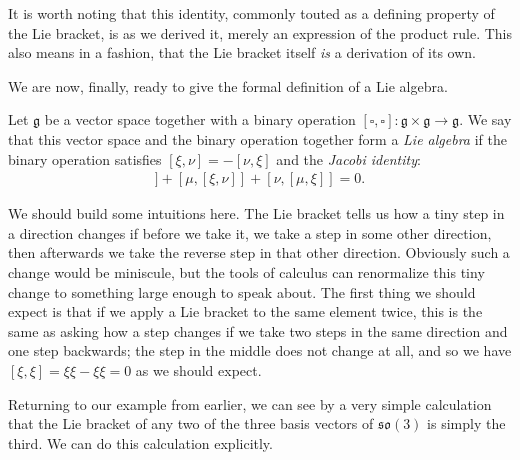 \documentclass[11pt]{article}
\begin{document}
It is worth noting that this identity, commonly touted as a defining property of the Lie bracket, is as we derived it, merely an expression of the product rule. This also means in a fashion, that the Lie bracket itself \emph{is} a derivation of its own.

We are now, finally, ready to give the formal definition of a Lie algebra. \begin{definition}
Let $\mathfrak{g}$ be a vector space together with a binary operation $[\square,\square]\colon \mathfrak{g} \times \mathfrak{g} \to \mathfrak{g}$. We say that this vector space and the binary operation together form a \emph{Lie algebra} if the binary operation satisfies $[\xi,\nu] = -[\nu,\xi]$ and the \emph{Jacobi identity}: \begin{gather*}
[\xi,[\nu,\mu]] + [\mu,[\xi,\nu]] + [\nu,[\mu,\xi]]= 0.
\end{gather*}
\end{definition}

We should build some intuitions here. The Lie bracket tells us how a tiny step in a direction changes if before we take it, we take a step in some other direction, then afterwards we take the reverse step in that other direction. Obviously such a change would be miniscule, but the tools of calculus can renormalize this tiny change to something large enough to speak about. The first thing we should expect is that if we apply a Lie bracket to the same element twice, this is the same as asking how a step changes if we take two steps in the same direction and one step backwards; the step in the middle does not change at all, and so we have $[\xi,\xi] = \xi\xi - \xi \xi = 0$ as we should expect.



Returning to our example from earlier, we can see by a very simple calculation that the Lie bracket of any two of the three basis vectors of $\mathfrak{so}(3)$ is simply the third. We can do this calculation explicitly.
\end{document}
